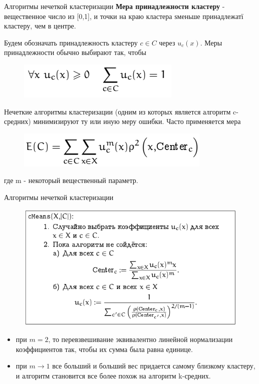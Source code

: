 \documentclass{beamer}
\begin{document}
\begin{frame}{Алгоритмы нечеткой кластеризации}
\textbf{Мера принадлежности кластеру} - вещественное число из [0,1], и точки на краю кластера ѕменьше принадлежатї кластеру, чем в центре.

Будем обозначать принадлежность кластеру $c\in C$ через $u_c(x)$. Меры принадлежности обычно выбирают так, чтобы
\begin{figure}[h]
\centering
\includegraphics[scale=0.75]{images/lec07-pic29.png}
\end{figure}
Нечеткие алгоритмы кластеризации (одним из которых является алгоритм c-средних) минимизируют ту или иную меру ошибки. Часто применяется мера
\begin{figure}[h]
\centering
\includegraphics[scale=0.75]{images/lec07-pic30.png}
\end{figure}
где m - некоторый вещественный параметр.
\end{frame}

\begin{frame}{Алгоритмы нечеткой кластеризации}
\begin{figure}[h]
\centering
\includegraphics[scale=0.5]{images/lec07-pic31.png}
\end{figure}
\begin{itemize}
\item при $m=2$, то перевзвешивание эквивалентно линейной нормализации коэффициентов так, чтобы их сумма была равна единице. 
\item при $m\rightarrow 1$ все больший и больший вес придается самому близкому кластеру, и алгоритм становится все более похож на алгоритм k-средних.
\end{itemize}
\end{frame}
\end{document}
